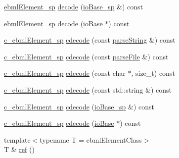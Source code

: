 \begin{DoxyCompactItemize}
\item 
\mbox{\hyperlink{namespaceebml_adad533b7705a16bb360fe56380c5e7be}{ebml\+Element\+\_\+sp}} \mbox{\hyperlink{classebml_1_1ebmlElementClass_ade81fc2a088d16f40474fd9885770f84}{decode}} (\mbox{\hyperlink{namespaceebml_a7bb59128ac6af27e47367938a846b569}{io\+Base\+\_\+sp}} \&) const
\item 
\mbox{\hyperlink{namespaceebml_adad533b7705a16bb360fe56380c5e7be}{ebml\+Element\+\_\+sp}} \mbox{\hyperlink{classebml_1_1ebmlElementClass_a313f310d2501859a73ba5d19ebacb550}{decode}} (\mbox{\hyperlink{classebml_1_1ioBase}{io\+Base}} $\ast$) const
\item 
\mbox{\hyperlink{namespaceebml_a2deef4e8071531b32e3533f1bf978917}{c\+\_\+ebml\+Element\+\_\+sp}} \mbox{\hyperlink{classebml_1_1ebmlElementClass_ad44d7844db705e5e1d8c35a780b58486}{cdecode}} (const \mbox{\hyperlink{classebml_1_1parseString}{parse\+String}} \&) const
\item 
\mbox{\hyperlink{namespaceebml_a2deef4e8071531b32e3533f1bf978917}{c\+\_\+ebml\+Element\+\_\+sp}} \mbox{\hyperlink{classebml_1_1ebmlElementClass_a6a6432b7bf633821f27015e111928b15}{cdecode}} (const \mbox{\hyperlink{classebml_1_1parseFile}{parse\+File}} \&) const
\item 
\mbox{\hyperlink{namespaceebml_a2deef4e8071531b32e3533f1bf978917}{c\+\_\+ebml\+Element\+\_\+sp}} \mbox{\hyperlink{classebml_1_1ebmlElementClass_ab365b1b7024bbf0dd625694a71f7e7ba}{cdecode}} (const char $\ast$, size\+\_\+t) const
\item 
\mbox{\hyperlink{namespaceebml_a2deef4e8071531b32e3533f1bf978917}{c\+\_\+ebml\+Element\+\_\+sp}} \mbox{\hyperlink{classebml_1_1ebmlElementClass_a2696f361d3cf6f1f544657266ad21808}{cdecode}} (const std\+::string \&) const
\item 
\mbox{\hyperlink{namespaceebml_a2deef4e8071531b32e3533f1bf978917}{c\+\_\+ebml\+Element\+\_\+sp}} \mbox{\hyperlink{classebml_1_1ebmlElementClass_a01de47338b3df5a666b989d9d85fa1d5}{cdecode}} (\mbox{\hyperlink{namespaceebml_a7bb59128ac6af27e47367938a846b569}{io\+Base\+\_\+sp}} \&) const
\item 
\mbox{\hyperlink{namespaceebml_a2deef4e8071531b32e3533f1bf978917}{c\+\_\+ebml\+Element\+\_\+sp}} \mbox{\hyperlink{classebml_1_1ebmlElementClass_a583586c72ae328913f0a920843d46677}{cdecode}} (\mbox{\hyperlink{classebml_1_1ioBase}{io\+Base}} $\ast$) const
\item 
{\footnotesize template$<$typename T  = ebml\+Element\+Class$>$ }\\T \& \mbox{\hyperlink{classebml_1_1ebmlElementClass_a9ad70f610118f70424b5ff92468ad1ca}{ref}} ()

\end{DoxyCompactItemize}
